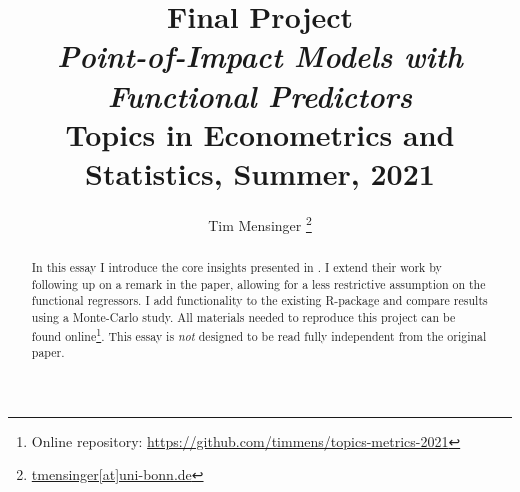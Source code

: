 \documentclass[a4paper, 12pt]{article}
\title{\textbf{Final Project}\\
    \large \textit{Point-of-Impact Models with Functional Predictors}\\[1em]
    \Large Topics in Econometrics and Statistics, Summer, 2021
}
\date{}
\author{Tim Mensinger%
  \thanks{\href{mailto:tmensinger@uni-bonn.de}{tmensinger[at]uni-bonn.de}}}
\affil{University of Bonn}
\begin{document}
\onehalfspacing


\maketitle
\begin{abstract}
    In this essay I introduce the core insights presented in \cite{Kneip2020}. I extend
    their work by following up on a remark in the paper, allowing for a less restrictive
    assumption on the functional regressors. I add functionality to the existing
    \textsf{R}-package and compare results using a Monte-Carlo study. All materials
    needed to reproduce this project can be found online\footnote{Online repository:
    \url{https://github.com/timmens/topics-metrics-2021}}. This essay is \emph{not}
    designed to be read fully independent from the original paper.
\end{abstract}
\thispagestyle{empty}

\newpage






\newpage
\printbibliography
\end{document}
